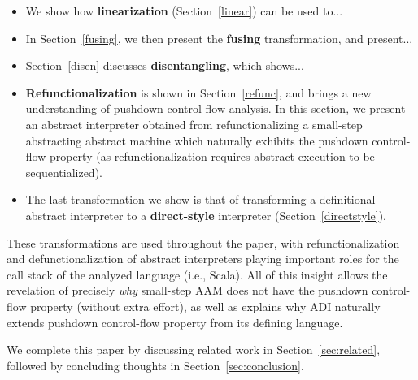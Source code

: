 \documentclass[acmsmall,review,anonymous]{acmart}\settopmatter{printfolios=true,printccs=false,printacmref=false}
\begin{document}
\begin{itemize}
\item We show how \textbf{linearization} (Section~\ref{linear}) can be used to...
\item In Section~\ref{fusing}, we then present the \textbf{fusing} transformation, and present...
\item Section~\ref{disen} discusses \textbf{disentangling}, which shows...
\item \textbf{Refunctionalization} is shown in Section~\ref{refunc}, and brings a new understanding of pushdown control flow analysis. In this section, we present an abstract interpreter obtained from refunctionalizing a small-step abstracting abstract machine which naturally exhibits the pushdown control-flow property (as refunctionalization requires abstract execution to be sequentialized).
\item The last transformation we show is that of transforming a definitional abstract interpreter to a \textbf{direct-style} interpreter (Section~\ref{directstyle}).

\end{itemize}

These transformations are used throughout the paper, with refunctionalization and
defunctionalization of abstract interpreters playing important roles for the call stack of
the analyzed language (i.e., Scala). All of this insight allows the revelation of
precisely \emph{why} small-step AAM does not have the pushdown control-flow property
(without extra effort), as well as explains why ADI naturally extends pushdown control-flow
property from its defining language.

We complete this paper by discussing related work in Section~\ref{sec:related}, followed by concluding thoughts in Section~\ref{sec:conclusion}.




\end{document}
